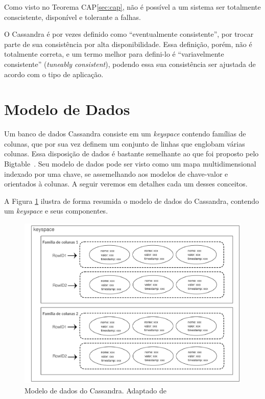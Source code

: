 Como visto no Teorema CAP\ref{sec:cap}, não é possível a um sistema ser totalmente conscistente, disponível e tolerante a falhas. 

O Cassandra é por vezes definido como \enquote{eventualmente consistente}, por trocar parte de sua consistência por alta disponibilidade. Essa definição, porém, não é totalmente correta, e um termo melhor para defini-lo é \enquote{variavelmente consistente} (\emph{tuneably consistent}), podendo essa sua consistência ser ajustada de acordo com o tipo de aplicação.

\section{Modelo de Dados}

Um banco de dados Cassandra consiste em um \emph{keyspace} contendo famílias de colunas, que por sua vez definem um conjunto de linhas que englobam várias colunas. Essa disposição de dados é bastante semelhante ao que foi proposto pelo Bigtable~\cite{lakshmancassandra, bigtable}. Seu modelo de dados pode ser visto como um mapa multidimensional indexado por uma chave, se assemelhando aos modelos de chave-valor e orientados à colunas. A seguir veremos em detalhes cada um desses conceitos.

A Figura \ref{fig:cassandradm} ilustra de forma resumida o modelo de dados do Cassandra, contendo um \emph{keyspace} e seus componentes. 

\begin{figure}[!htb]
\centering
\includegraphics[width=1.1\textwidth]{figuras/cassandradatamodel.png}
\caption{Modelo de dados do Cassandra. Adaptado de ~\cite{ibmcassandra}}
\label{fig:cassandradm}
\end{figure}

